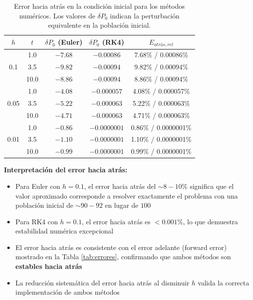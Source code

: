 \documentclass[a4paper,10pt,twocolumn]{article}
\begin{document}
\begin{table}[t]
\centering
\footnotesize
\begin{tabular}{|c|c|c|c|c|}
\hline
\textbf{$h$} & \textbf{$t$} & \textbf{$\delta P_0$ (Euler)} & \textbf{$\delta P_0$ (RK4)} & \textbf{$E_{atrás,rel}$} \\
\hline
\multirow{3}{*}{0.1}
  & 1.0  & $-7.68$ & $-0.00086$ & 7.68\% / 0.00086\% \\
  & 3.5  & $-9.82$ & $-0.00094$ & 9.82\% / 0.00094\% \\
  & 10.0 & $-8.86$ & $-0.00094$ & 8.86\% / 0.00094\% \\
\hline
\multirow{3}{*}{0.05}
  & 1.0  & $-4.08$ & $-0.000057$ & 4.08\% / 0.000057\% \\
  & 3.5  & $-5.22$ & $-0.000063$ & 5.22\% / 0.000063\% \\
  & 10.0 & $-4.71$ & $-0.000063$ & 4.71\% / 0.000063\% \\
\hline
\multirow{3}{*}{0.01}
  & 1.0  & $-0.86$ & $-0.0000001$ & 0.86\% / 0.0000001\% \\
  & 3.5  & $-1.10$ & $-0.0000001$ & 1.10\% / 0.0000001\% \\
  & 10.0 & $-0.99$ & $-0.0000001$ & 0.99\% / 0.0000001\% \\
\hline
\end{tabular}
\caption{Error hacia atrás en la condición inicial para los métodos numéricos. Los valores de $\delta P_0$ indican la perturbación equivalente en la población inicial.}
\label{tab:error-atras}
\end{table}

\textbf{Interpretación del error hacia atrás:}
\begin{itemize}
    \item Para Euler con $h=0.1$, el error hacia atrás del $\sim 8-10\%$ significa que el valor aproximado corresponde a resolver exactamente el problema con una población inicial de $\sim 90-92$ en lugar de $100$
    \item Para RK4 con $h=0.1$, el error hacia atrás es $< 0.001\%$, lo que demuestra estabilidad numérica excepcional
    \item El error hacia atrás es consistente con el error adelante (forward error) mostrado en la Tabla \ref{tab:errores}, confirmando que ambos métodos son \textbf{estables hacia atrás}
    \item La reducción sistemática del error hacia atrás al disminuir $h$ valida la correcta implementación de ambos métodos
\end{itemize}
\end{document}
